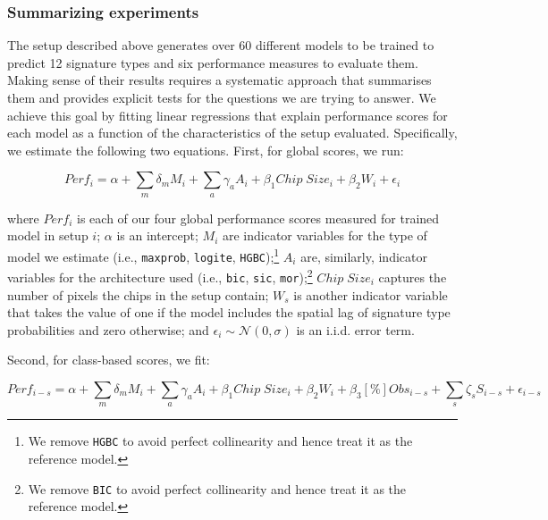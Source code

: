 \documentclass[]{interact}
\theoremstyle{plain}%
\theoremstyle{definition}
\theoremstyle{remark}
\begin{document}
\subsubsection{Summarizing experiments}


The setup described above generates over 60 different
models to be trained to predict 12 signature types and six performance measures
to evaluate them. Making sense of their results requires a
systematic approach that summarises them and provides explicit tests for the
questions we are trying to answer. We achieve this goal by fitting linear
regressions that explain performance scores for each model as a function
of the characteristics of the setup evaluated. Specifically, we estimate the
following two equations. First, for global scores, we run:

\begin{equation}
        Perf_i = \alpha +
        \sum_m \delta_m M_i +
        \sum_a \gamma_a A_i +
        \beta_1 Chip \; Size_i +
        \beta_2 W_i +
        \epsilon_i
        \label{eq:reg_global}
\end{equation}


where $Perf_i$ is each of our four global performance scores measured for trained
model in setup $i$; $\alpha$ is an intercept; $M_i$ are indicator variables for the
type of model we estimate (i.e., \texttt{maxprob}, \texttt{logite},
\texttt{HGBC});\footnote{We remove \texttt{HGBC} to avoid perfect
collinearity and hence treat it as the reference model.} $A_i$ are,
similarly, indicator variables for the architecture used (i.e.,
\texttt{bic}, \texttt{sic}, \texttt{mor});\footnote{We remove \texttt{BIC} to avoid perfect
collinearity and hence treat it as the reference model.} $Chip \; Size_i$
captures the number of pixels the chips in the setup contain; $W_s$ is another
indicator variable that takes the value of one if the model includes the
spatial lag of signature type probabilities and zero otherwise;
and $\epsilon_i \sim \mathcal{N}(0, \sigma)$ is an i.i.d. error term.

Second, for class-based scores, we fit:

\begin{equation}
        Perf_{i-s} = \alpha +
        \sum_m \delta_m M_i +
        \sum_a \gamma_a A_i +
        \beta_1 Chip \; Size_i +
        \beta_2 W_i +
        \beta_3 \left[\%\right]Obs_{i-s} +
        \sum_s \zeta_s S_{i-s} +
        \epsilon_{i-s}
        \label{eq:reg_class}
\end{equation}
\end{document}
